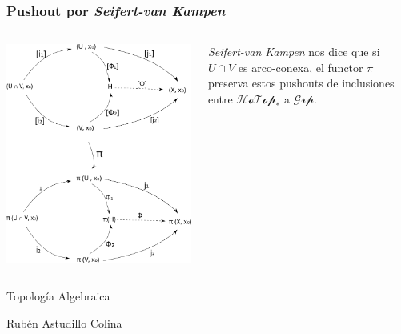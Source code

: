 \documentclass[xetex,mathserif,serif]{beamer}
\newcommand{\vank}{\emph{Seifert-van Kampen} }
\begin{document}
  \begin{frame}
    \frametitle{Pushout por \vank}
    \begin{columns}
      \begin{column}{0.6\textwidth}
        \begin{flushleft}
          \includegraphics[scale=0.33]{../tesis/imagenes/pushoutHotop.png}
        \end{flushleft}
      \end{column}
      \begin{column}{0.4\textwidth}
        \begin{block}{}
          \vank nos dice que si \(U \cap V\) es arco-conexa, el functor
          \(\pi\) preserva estos pushouts de inclusiones entre
          \(\mathscr{HoTop}_*\) a \(\mathscr{Grp}\).
        \end{block}
      \end{column}
    \end{columns}
  \end{frame}
  \begin{frame}
    \begin{block}{}
      \centering
      Topología Algebraica
    \end{block}
    \begin{block}{}
      \centering
      Rubén Astudillo Colina
    \end{block}

  \end{frame}
\end{document}
